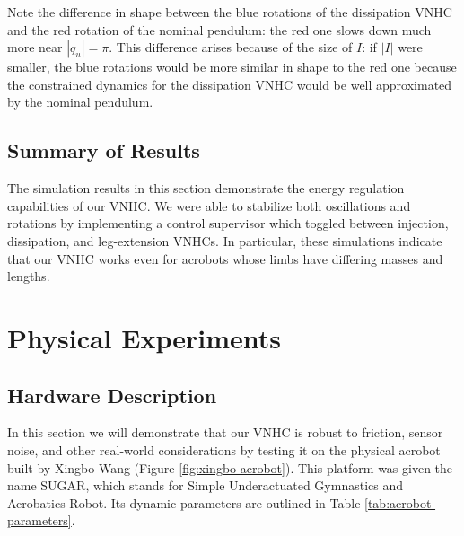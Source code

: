 \documentclass[journal,twoside,onecolumn,draftclsnofoot,web]{ieeecolor}
\begin{document}
{Note the difference in shape between the blue rotations of the dissipation VNHC
and the red rotation of the nominal pendulum: the red one slows down much more
near \(|q_u| = \pi\).
This difference arises because of the size of \(I\):
if \(|I|\) were smaller, the blue rotations would be more similar in shape to the
red one because the constrained dynamics for the dissipation VNHC would be
well approximated by the nominal pendulum.

\subsection{Summary of Results}
The simulation results in this section demonstrate the energy regulation
capabilities of our VNHC.  
We were able to stabilize both oscillations and rotations by implementing a
control supervisor which toggled between injection, dissipation, and
leg-extension VNHCs.
In particular, these simulations indicate that our VNHC
works even for acrobots whose limbs have differing masses and lengths.

\section{Physical Experiments}\label{sec:experiments}

\subsection{Hardware Description}
In this section we will demonstrate that our VNHC is robust to friction, sensor
noise, and other real-world considerations by testing it on the physical
acrobot built by Xingbo Wang \cite{xingbo_thesis} 
(Figure \ref{fig:xingbo-acrobot}).
This platform was given the name SUGAR, which stands for
Simple Underactuated Gymnastics and Acrobatics Robot.
Its dynamic parameters are outlined in Table \ref{tab:acrobot-parameters}.


}
\end{document}
